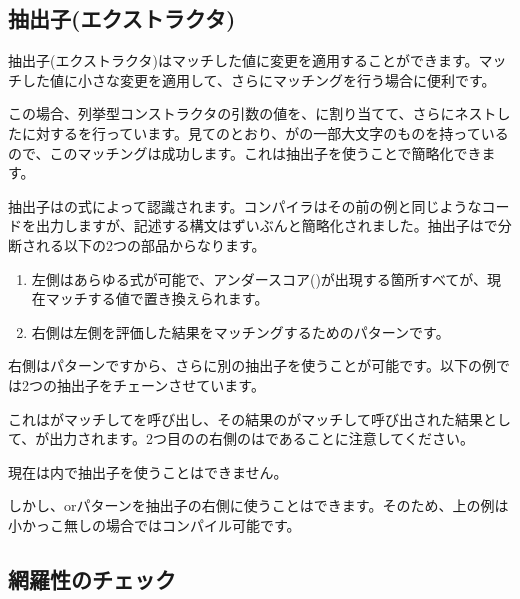 \subsection{抽出子(エクストラクタ)}
\label{lf-pattern-matching-extractors}

抽出子(エクストラクタ)はマッチした値に変更を適用することができます。マッチした値に小さな変更を適用して、さらにマッチングを行う場合に便利です。


この場合、列挙型コンストラクタの引数の値を、に割り当てて、さらにネストしたに対するを行っています。見てのとおり、がの一部大文字のものを持っているので、このマッチングは成功します。これは抽出子を使うことで簡略化できます。


抽出子はの式によって認識されます。コンパイラはその前の例と同じようなコードを出力しますが、記述する構文はずいぶんと簡略化されました。抽出子は\expr{=>}で分断される以下の2つの部品からなります。

\begin{enumerate}
\item 左側はあらゆる式が可能で、アンダースコア(\expr{_})が出現する箇所すべてが、現在マッチする値で置き換えられます。
\item 右側は左側を評価した結果をマッチングするためのパターンです。
\end{enumerate}

右側はパターンですから、さらに別の抽出子を使うことが可能です。以下の例では2つの抽出子をチェーンさせています。


これはがマッチしてを呼び出し、その結果のがマッチして呼び出された結果として、が出力されます。2つ目の\expr{=>}の右側のはであることに注意してください。

現在は内で抽出子を使うことはできません。


しかし、orパターンを抽出子の右側に使うことはできます。そのため、上の例は小かっこ無しの場合ではコンパイル可能です。

\subsection{網羅性のチェック}
\label{lf-pattern-matching-exhaustiveness}

